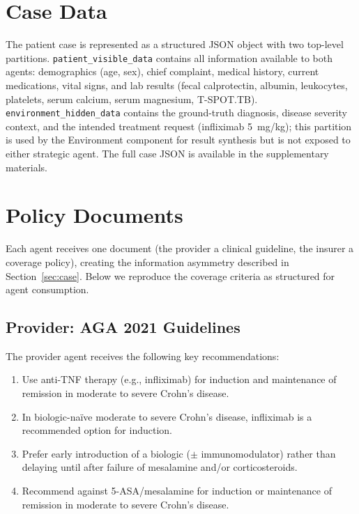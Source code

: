 \section{Case Data}
\label{sec:case-data}

The patient case is represented as a structured JSON object with two top-level partitions. \texttt{patient\_visible\_data} contains all information available to both agents: demographics (age, sex), chief complaint, medical history, current medications, vital signs, and lab results (fecal calprotectin, albumin, leukocytes, platelets, serum calcium, serum magnesium, T-SPOT.TB). \texttt{environment\_hidden\_data} contains the ground-truth diagnosis, disease severity context, and the intended treatment request (infliximab 5~mg/kg); this partition is used by the Environment component for result synthesis but is not exposed to either strategic agent. The full case JSON is available in the supplementary materials.

\section{Policy Documents}
\label{sec:policies}

Each agent receives one document (the provider a clinical guideline, the insurer a coverage policy), creating the information asymmetry described in Section~\ref{sec:case}. Below we reproduce the coverage criteria as structured for agent consumption.

\subsection{Provider: AGA 2021 Guidelines}

The provider agent receives the following key recommendations:
\begin{enumerate}
    \item Use anti-TNF therapy (e.g., infliximab) for induction and maintenance of remission in moderate to severe Crohn's disease.
    \item In biologic-na\"ive moderate to severe Crohn's disease, infliximab is a recommended option for induction.
    \item Prefer early introduction of a biologic ($\pm$ immunomodulator) rather than delaying until after failure of mesalamine and/or corticosteroids.
    \item Recommend against 5-ASA/mesalamine for induction or maintenance of remission in moderate to severe Crohn's disease.
\end{enumerate}

